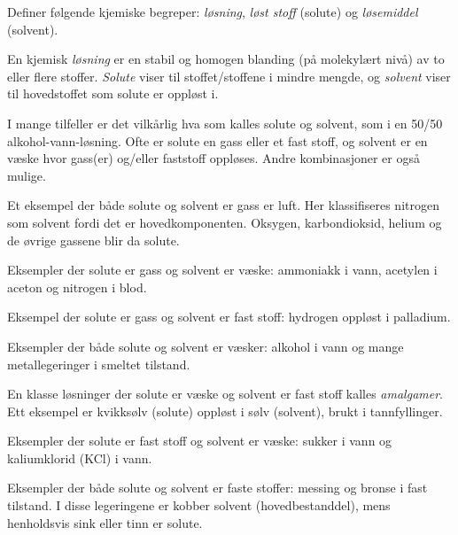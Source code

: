 

Definer følgende kjemiske begreper: {\it løsning}, {\it løst stoff} (solute) og {\it løsemiddel} (solvent).







En kjemisk {\it løsning} er en stabil og homogen blanding (på molekylært nivå) av to eller flere stoffer. {\it Solute} viser til stoffet/stoffene i mindre mengde, og {\it solvent} viser til hovedstoffet som solute er oppløst i.

\vskip 10pt

I mange tilfeller er det vilkårlig hva som kalles solute og solvent, som i en 50/50 alkohol-vann-løsning. Ofte er solute en gass eller et fast stoff, og solvent er en væske hvor gass(er) og/eller faststoff oppløses. Andre kombinasjoner er også mulige.

\vskip 10pt

Et eksempel der både solute og solvent er gass er luft. Her klassifiseres nitrogen som solvent fordi det er hovedkomponenten. Oksygen, karbondioksid, helium og de øvrige gassene blir da solute.

\vskip 10pt

Eksempler der solute er gass og solvent er væske: ammoniakk i vann, acetylen i aceton og nitrogen i blod.

\vskip 10pt

Eksempel der solute er gass og solvent er fast stoff: hydrogen oppløst i palladium.

\vskip 10pt

Eksempler der både solute og solvent er væsker: alkohol i vann og mange metallegeringer i smeltet tilstand.

\vskip 10pt

En klasse løsninger der solute er væske og solvent er fast stoff kalles {\it amalgamer}. Ett eksempel er kvikksølv (solute) oppløst i sølv (solvent), brukt i tannfyllinger.

\vskip 10pt

Eksempler der solute er fast stoff og solvent er væske: sukker i vann og kaliumklorid (KCl) i vann.

\vskip 10pt

Eksempler der både solute og solvent er faste stoffer: messing og bronse i fast tilstand. I disse legeringene er kobber solvent (hovedbestanddel), mens henholdsvis sink eller tinn er solute.









